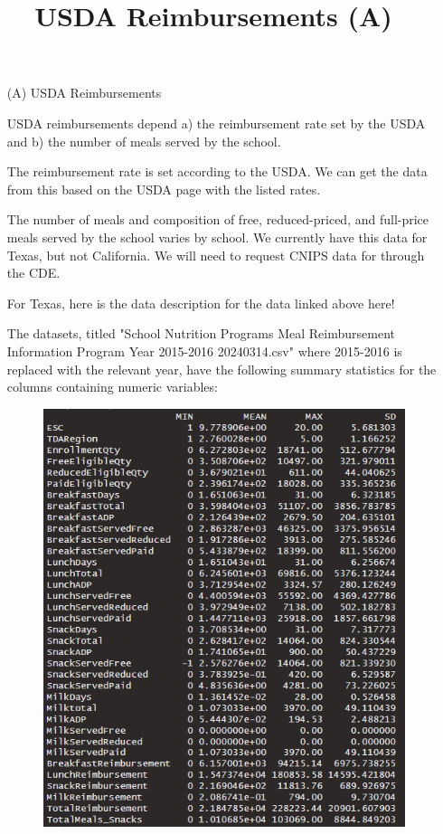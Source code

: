 \documentclass[12pt]{article}
\begin{document}
\begin{enumerate}
	\item[(A)] USDA Reimbursements
	
	USDA reimbursements depend a) the reimbursement rate set by the USDA and b) the number of meals served by the school.
	
	The reimbursement rate is set according to the USDA. We can get the data from this based on the USDA page with the listed rates. %
	
	The number of meals and composition of free, reduced-priced, and full-price meals served by the school varies by school. We currently have this data for Texas, but not California. We will need to request CNIPS data for through the CDE. 
	
	For Texas, here is the data description for the data linked above here! 
	
	The datasets, titled "School Nutrition Programs Meal Reimbursement Information Program Year 2015-2016 20240314.csv" where 2015-2016 is replaced with the relevant year, have the following summary statistics for the columns containing numeric variables:
	
	\begin{figure}
		\centering
		\includegraphics[width = \linewidth, keepaspectratio] {"summary_stats_A.png"}
		\title{USDA Reimbursements (A)}
	\end{figure}
	

\end{enumerate}
\end{document}
